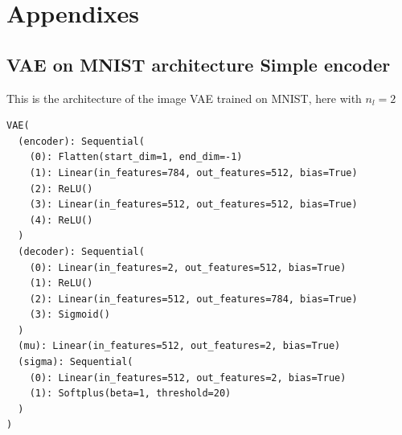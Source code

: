 \documentclass{article}
\begin{document}
\printbibliography
% 



\section{Appendixes}

\subsection{VAE on MNIST architecture Simple encoder}
\label{subsec:VAE MNIST archi}

This is the architecture of the image VAE trained on MNIST, here with $n_l = 2$
\begin{lstlisting}
VAE(
  (encoder): Sequential(
    (0): Flatten(start_dim=1, end_dim=-1)
    (1): Linear(in_features=784, out_features=512, bias=True)
    (2): ReLU()
    (3): Linear(in_features=512, out_features=512, bias=True)
    (4): ReLU()
  )
  (decoder): Sequential(
    (0): Linear(in_features=2, out_features=512, bias=True)
    (1): ReLU()
    (2): Linear(in_features=512, out_features=784, bias=True)
    (3): Sigmoid()
  )
  (mu): Linear(in_features=512, out_features=2, bias=True)
  (sigma): Sequential(
    (0): Linear(in_features=512, out_features=2, bias=True)
    (1): Softplus(beta=1, threshold=20)
  )
)
\end{lstlisting}
\end{document}
